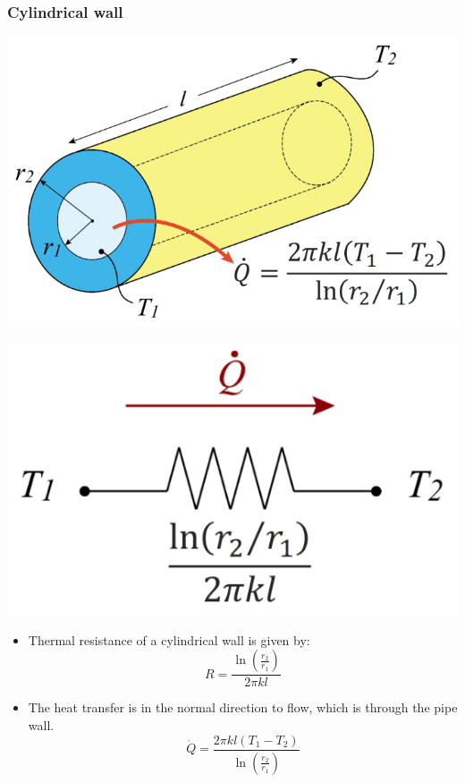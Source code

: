 \documentclass[11pt]{article}
\begin{document}
\subsubsection{Cylindrical wall}
\label{sec:orgc7aee93}
\begin{center}
\includegraphics[scale=1]{./images/thermal-resistance-cylindrical-wall.png}
\end{center}
\begin{center}
\includegraphics[scale=1]{./images/thermal-resistance-cylindrical-wall-electrical-analogy.png}
\end{center}
\begin{itemize}
\item Thermal resistance of a cylindrical wall is given by:
\[R = \frac{\ln \left(\frac{r_2}{r_1} \right)}{2 \pi k l}\]
\item The heat transfer is in the normal direction to flow, which is through the pipe wall.
\[\dot{Q} = \frac{2 \pi kl (T_1 - T_2)}{\ln \left(\frac{r_2}{r_1} \right)}\]
\end{itemize}
\end{document}

